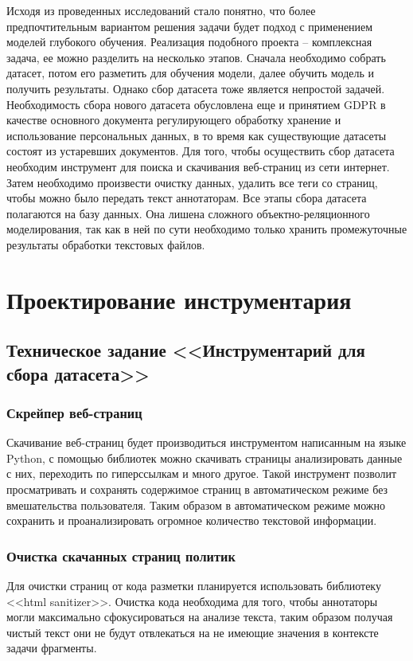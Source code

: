 \documentclass[../main]{subfiles}
\begin{document}
Исходя из проведенных исследований стало понятно, что более предпочтительным вариантом решения задачи будет подход с применением моделей глубокого обучения. Реализация подобного проекта -- комплексная задача, ее можно разделить на несколько этапов. Сначала необходимо собрать датасет, потом его разметить для обучения модели, далее обучить модель и получить результаты. Однако сбор датасета тоже является непростой задачей. Необходимость сбора нового датасета обусловлена еще и принятием GDPR в качестве основного документа регулирующего обработку хранение и использование персональных данных, в то время как существующие датасеты состоят из устаревших документов. Для того, чтобы осуществить сбор датасета необходим инструмент для поиска и скачивания веб-страниц из сети интернет. Затем необходимо произвести очистку данных, удалить все теги со страниц, чтобы можно было передать текст аннотаторам. Все этапы сбора датасета полагаются на базу данных. Она лишена сложного объектно-реляционного моделирования, так как в ней по сути необходимо только хранить промежуточные результаты обработки текстовых файлов.


\newpage
\section{Проектирование инструментария}

\subsection{Техническое задание <<Инструментарий для сбора датасета>>}

\subsubsection{Скрейпер веб-страниц}
Скачивание веб-страниц будет производиться инструментом написанным на языке Python, с помощью библиотек можно скачивать страницы анализировать данные с них, переходить по гиперссылкам и много другое. Такой инструмент позволит просматривать и сохранять содержимое страниц в автоматическом режиме без вмешательства пользователя. Таким образом в автоматическом режиме можно сохранить и проанализировать огромное количество текстовой информации.

\subsubsection{Очистка скачанных страниц политик}
Для очистки страниц от кода разметки планируется использовать библиотеку <<html sanitizer>>. Очистка кода необходима для того, чтобы аннотаторы могли максимально сфокусироваться на анализе текста, таким образом получая чистый текст они не будут отвлекаться на не имеющие значения в контексте задачи фрагменты.
\end{document}
